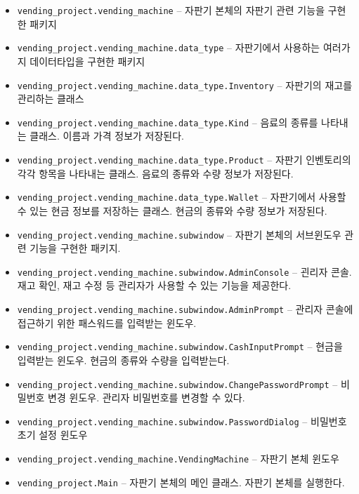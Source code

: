\documentclass{oblivoir}
\begin{document}
\begin{itemize}
        \item \texttt{vending\_project.vending\_machine} --
        자판기 본체의 자판기 관련 기능을 구현한 패키지
        \item \texttt{vending\_project.vending\_machine.data\_type} --
        자판기에서 사용하는 여러가지 데이터타입을 구현한 패키지
        \item \texttt{vending\_project.vending\_machine.data\_type.Inventory} --
        자판기의 재고를 관리하는 클래스
        \item \texttt{vending\_project.vending\_machine.data\_type.Kind} --
        음료의 종류를 나타내는 클래스. 이름과 가격 정보가 저장된다.
        \item \texttt{vending\_project.vending\_machine.data\_type.Product} --
        자판기 인벤토리의 각각 항목을 나타내는 클래스. 음료의 종류와 수량 정보가 저장된다.
        \item \texttt{vending\_project.vending\_machine.data\_type.Wallet} --
        자판기에서 사용할 수 있는 현금 정보를 저장하는 클래스. 현금의 종류와 수량 정보가 저장된다.
        \item \texttt{vending\_project.vending\_machine.subwindow} --
        자판기 본체의 서브윈도우 관련 기능을 구현한 패키지.
        \item \texttt{vending\_project.vending\_machine.subwindow.AdminConsole} --
        괸리자 콘솔. 재고 확인, 재고 수정 등 관리자가 사용할 수 있는 기능을 제공한다.
        \item \texttt{vending\_project.vending\_machine.subwindow.AdminPrompt} --
        관리자 콘솔에 접근하기 위한 패스워드를 입력받는 윈도우.
        \item \texttt{vending\_project.vending\_machine.subwindow.CashInputPrompt} --
        현금을 입력받는 윈도우. 현금의 종류와 수량을 입력받는다.
        \item \texttt{vending\_project.vending\_machine.subwindow.ChangePasswordPrompt} --
        비밀번호 변경 윈도우. 관리자 비밀번호를 변경할 수 있다.
        \item \texttt{vending\_project.vending\_machine.subwindow.PasswordDialog} --
        비밀번호 초기 설정 윈도우
        \item \texttt{vending\_project.vending\_machine.VendingMachine} --
        자판기 본체 윈도우
        \item \texttt{vending\_project.Main} --
        자판기 본체의 메인 클래스. 자판기 본체를 실행한다.
    \end{itemize}
\end{document}
